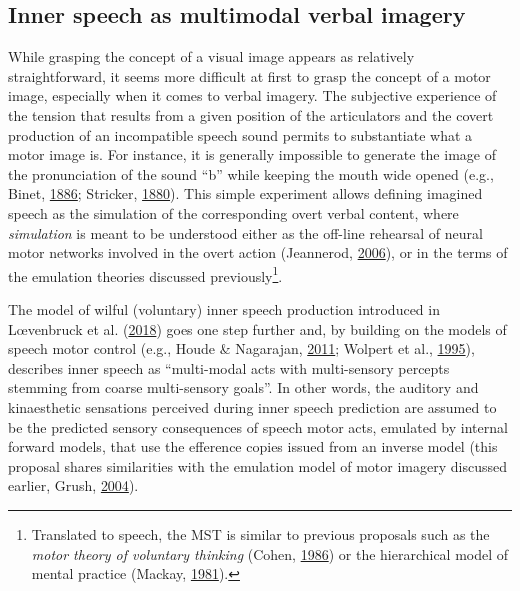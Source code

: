 \documentclass[a4paper,12pt,twoside,openright,oldfontcommands]{memoir}
\let\rmarkdownfootnote\footnote%
\def\footnote{\protect\rmarkdownfootnote}
\begin{document}
\subsection{Inner speech as multimodal verbal
imagery}\label{inner-speech-as-multimodal-verbal-imagery}

While grasping the concept of a visual image appears as relatively
straightforward, it seems more difficult at first to grasp the concept
of a motor image, especially when it comes to verbal imagery. The
subjective experience of the tension that results from a given position
of the articulators and the covert production of an incompatible speech
sound permits to substantiate what a motor image is. For instance, it is
generally impossible to generate the image of the pronunciation of the
sound ``b'' while keeping the mouth wide opened (e.g., Binet,
\protect\hyperlink{ref-binet_psychologie_1886}{1886}; Stricker,
\protect\hyperlink{ref-stricker_studien_1880}{1880}). This simple
experiment allows defining imagined speech as the simulation of the
corresponding overt verbal content, where \emph{simulation} is meant to
be understood either as the off-line rehearsal of neural motor networks
involved in the overt action (Jeannerod,
\protect\hyperlink{ref-jeannerod_motor_2006}{2006}), or in the terms of
the emulation theories discussed previously\footnote{Translated to
  speech, the MST is similar to previous proposals such as the
  \emph{motor theory of voluntary thinking} (Cohen,
  \protect\hyperlink{ref-cohen_motor_1986}{1986}) or the hierarchical
  model of mental practice (Mackay,
  \protect\hyperlink{ref-mackay_problem_1981}{1981}).}.

The model of wilful (voluntary) inner speech production introduced in
Lœvenbruck et al.
(\protect\hyperlink{ref-loevenbruck_cognitive_2018}{2018}) goes one step
further and, by building on the models of speech motor control (e.g.,
Houde \& Nagarajan, \protect\hyperlink{ref-houde_speech_2011}{2011};
Wolpert et al., \protect\hyperlink{ref-wolpert_internal_1995}{1995}),
describes inner speech as ``multi-modal acts with multi-sensory percepts
stemming from coarse multi-sensory goals''. In other words, the auditory
and kinaesthetic sensations perceived during inner speech prediction are
assumed to be the predicted sensory consequences of speech motor acts,
emulated by internal forward models, that use the efference copies
issued from an inverse model (this proposal shares similarities with the
emulation model of motor imagery discussed earlier, Grush,
\protect\hyperlink{ref-grush_emulation_2004}{2004}).
\end{document}
